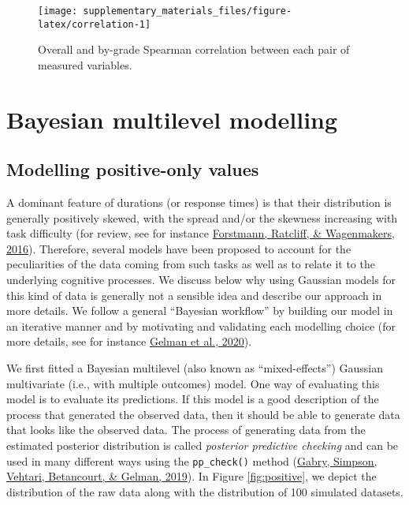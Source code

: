 \documentclass[
  11pt,
  english,
  ,doc,floatsintext]{apa6}
\begin{document}
\begin{figure}[!htb]

{\centering \texttt{[image: supplementary\_materials\_files/figure-latex/correlation-1]} 

}

\caption{Overall and by-grade Spearman correlation between each pair of measured variables.}\label{fig:correlation}
\end{figure}

\newpage

\hypertarget{bayesian-multilevel-modelling}{%
\section{Bayesian multilevel modelling}\label{bayesian-multilevel-modelling}}

\hypertarget{modelling-positive-only-values}{%
\subsection{Modelling positive-only values}\label{modelling-positive-only-values}}

A dominant feature of durations (or response times) is that their distribution is generally positively skewed, with the spread and/or the skewness increasing with task difficulty (for review, see for instance \protect\hyperlink{ref-forstmann_sequential_2016}{Forstmann, Ratcliff, \& Wagenmakers, 2016}). Therefore, several models have been proposed to account for the peculiarities of the data coming from such tasks as well as to relate it to the underlying cognitive processes. We discuss below why using Gaussian models for this kind of data is generally not a sensible idea and describe our approach in more details. We follow a general ``Bayesian workflow'' by building our model in an iterative manner and by motivating and validating each modelling choice (for more details, see for instance \protect\hyperlink{ref-gelman_bayesian_2020}{Gelman et al., 2020}).

We first fitted a Bayesian multilevel (also known as ``mixed-effects'') Gaussian multivariate (i.e., with multiple outcomes) model. One way of evaluating this model is to evaluate its predictions. If this model is a good description of the process that generated the observed data, then it should be able to generate data that looks like the observed data. The process of generating data from the estimated posterior distribution is called \emph{posterior predictive checking} and can be used in many different ways using the \texttt{pp\_check()} method (\protect\hyperlink{ref-gabry_visualization_2019}{Gabry, Simpson, Vehtari, Betancourt, \& Gelman, 2019}). In Figure \ref{fig:positive}, we depict the distribution of the raw data along with the distribution of 100 simulated datasets.
\end{document}
